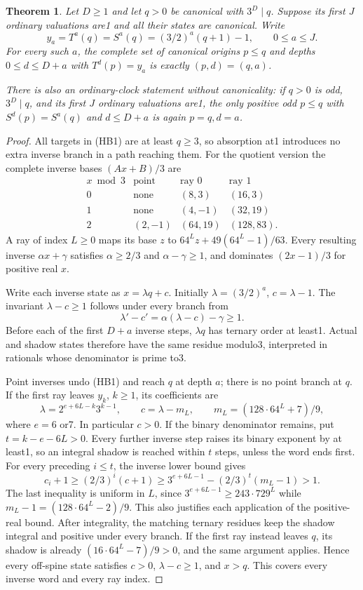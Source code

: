 \documentclass[11pt]{article}
\newtheorem{theorem}{Theorem}
\begin{document}
\begin{theorem}\label{thm:historyclockbarrier}
Let $D\ge1$ and let $q>0$ be canonical with $3^D\mid q$.
Suppose its first $J$ ordinary valuations are1 and all their states
are canonical. Write
\[
 y_a=T^a(q)=S^a(q)=(3/2)^a(q+1)-1,\qquad 0\le a\le J.
 \tag{HB1}
\]
For every such $a$, the complete set of canonical origins $p\le q$
and depths $0\le d\le D+a$ with $T^d(p)=y_a$ is
exactly $(p,d)=(q,a)$.

There is also an ordinary-clock statement without canonicality:
if $q>0$ is odd, $3^D\mid q$, and its first $J$ ordinary valuations
are1, the only positive odd $p\le q$ with
$S^d(p)=S^a(q)$ and $d\le D+a$ is again $p=q,d=a$.
\end{theorem}
\begin{proof}
All targets in (HB1) are at least $q\ge3$, so absorption at1
introduces no extra inverse branch in a path reaching them.
For the quotient version the complete inverse bases
$(Ax+B)/3$ are
\[
\begin{array}{c|c|cc}
 x\bmod3&\text{point}&\text{ray }0&\text{ray }1\\ \hline
 0&\text{none}&(8,3)&(16,3)\\
 1&\text{none}&(4,-1)&(32,19)\\
 2&(2,-1)&(64,19)&(128,83).
\end{array}
\]
A ray of index $L\ge0$ maps its base $z$ to
$64^Lz+49(64^L-1)/63$. Every resulting inverse
$\alpha x+\gamma$ satisfies
$\alpha\ge2/3$ and $\alpha-\gamma\ge1$,
and dominates $(2x-1)/3$ for positive real $x$.

Write each inverse state as $x=\lambda q+c$. Initially
$\lambda=(3/2)^a$, $c=\lambda-1$. The invariant
$\lambda-c\ge1$ follows under every branch from
\[
 \lambda'-c'=\alpha(\lambda-c)-\gamma\ge1.
\]
Before each of the first $D+a$ inverse steps, $\lambda q$
has ternary order at least1. Actual and shadow states therefore
have the same residue modulo3, interpreted in rationals whose
denominator is prime to3.

Point inverses undo (HB1) and reach $q$ at depth $a$;
there is no point branch at $q$. If the first ray leaves $y_k$,
$k\ge1$, its coefficients are
\[
 \lambda=2^{e+6L-k}3^{k-1},\qquad
 c=\lambda-m_L,\qquad m_L=(128\cdot64^L+7)/9,
 \tag{HB2}
\]
where $e=6$ or7. In particular $c>0$.
If the binary denominator remains, put $t=k-e-6L>0$.
Every further inverse step raises its binary exponent by at least1,
so an integral shadow is reached within $t$ steps, unless the word
ends first. For every preceding $i\le t$, the inverse lower bound gives
\[
 c_i+1\ge(2/3)^i(c+1)
 \ge3^{e+6L-1}-(2/3)^t(m_L-1)>1.
 \tag{HB3}
\]
The last inequality is uniform in $L$, since
$3^{e+6L-1}\ge243\cdot729^L$ while
$m_L-1=(128\cdot64^L-2)/9$.
This also justifies each application of the positive-real bound.
After integrality, the matching ternary residues keep the shadow
integral and positive under every branch. If the first ray instead
leaves $q$, its shadow is already
$(16\cdot64^L-7)/9>0$, and the same argument applies.
Hence every off-spine state satisfies $c>0$, $\lambda-c\ge1$,
and $x>q$. This covers every inverse word and every ray index.


\end{proof}
\end{document}

